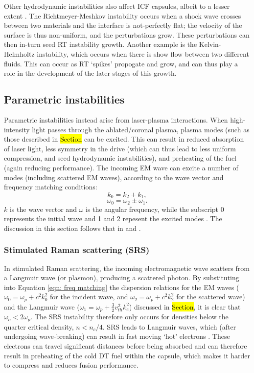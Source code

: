 Other hydrodynamic instabilities also affect ICF capsules, albeit to a lesser extent \cite{Atzeni2008}. The Richtmeyer-Meshkov instability occurs when a shock wave crosses between two materials and the interface is not-perfectly flat; the velocity of the surface is thus non-uniform, and the perturbations grow. These perturbations can then in-turn seed RT instability growth. Another example is the Kelvin-Helmholtz instability, which occurs when there is show flow between two different fluids. This can occur as RT `spikes' propogate and grow, and can thus play a role in the development of the later stages of this growth.

\subsection{Parametric instabilities} \label{Parametric instabilities}
Parametric instabilities instead arise from laser-plasma interactions. When high-intensity light passes through the ablated/coronal plasma, plasma modes (such as those described in \hl{Section} can be excited. This can result in reduced absorption of laser light, less symmetry in the drive (which can thus lead to less uniform compression, and seed hydrodynamic instabilities), and preheating of the fuel (again reducing performance). The incoming EM wave can excite a number of modes (including scattered EM waves), according to the wave vector and frequency matching conditions:
\begin{equation} k_0 = k_2 \pm k_1, \end{equation}
\begin{equation} \omega_0 = \omega_2 \pm \omega_1. \label{eqn: freq matching} \end{equation}
$k$ is the wave vector and $\omega$ is the angular frequency, while the subscript 0 represents the initial wave and 1 and 2 repesent the excited modes \cite{Chen2016}. The discussion in this section follows that in \cite{Chen2016} and \cite{Craxton2015}.

\subsubsection{Stimulated Raman scattering (SRS)}
In stimulated Raman scattering, the incoming electromagnetic wave scatters from a Langmuir wave (or plasmon), producing a scattered photon. By substituting into Equation \ref{eqn: freq matching} the dispersion relations for the EM waves ($\omega_0 = \omega_p + c^2 k_0^2$ for the incident wave, and $\omega_2 = \omega_p + c^2 k_2^2$ for the scattered wave) and the Langmuir wave ($\omega_1 = \omega_p + \frac{3}{2} v_{th}^2 k_e^2$) discussed in \hl{Section}, it is clear that $\omega_o < 2 \omega_p$. The SRS instability therefore only occurs for densities below the quarter critical density, $n < n_c / 4$. SRS  leads to Langmuir waves, which (after undergoing wave-breaking) can result in fast moving `hot' electrons \cite{Rosenberg2018}. These electrons can travel significant distances before being absorbed and can therefore result in preheating of the cold DT fuel within the capsule, which makes it harder to compress and reduces fusion performance.

